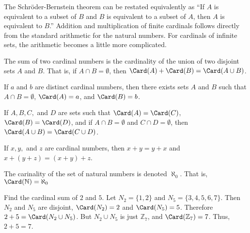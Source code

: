 \documentclass[crop=false,class=book,oneside]{standalone}
\begin{document}
            The Schr\"{o}der-Bernstein theorem can be restated
            equivalently as ``If $A$ is equivalent to a subset
            of $B$ and $B$ is equivalent to a subset of $A$,
            then $A$ is equivalent to $B$.''
            Addition and multiplication of finite cardinals
            follows directly from the standard arithmetic
            for the natural numbers. For cardinals of infinite
            sets, the arithmetic becomes a little more complicated.
            \begin{definition}
                The sum of two cardinal numbers is the
                cardinality of the union of two disjoint sets $A$
                and $B$. That is, if ${A}\cap{B}=\emptyset$, then
                $\Card(A)+\Card(B)=\Card({A}\cup{B})$.
            \end{definition}
            \begin{theorem*}
                If $a$ and $b$ are distinct cardinal numbers,
                then there exists sets $A$ and $B$ such that
                ${A}\cap{B}=\emptyset$, $\Card(A)=a$, and
                $\Card(B)=b$.
            \end{theorem*}
            \begin{theorem*}
                If $A,B,C,$ and $D$ are sets such that
                $\Card(A)=\Card(C)$, $\Card(B)=\Card(D)$,
                and if ${A}\cap{B}=\emptyset$ and
                ${C}\cap{D}=\emptyset$, then
                $\Card({A}\cup{B})=\Card({C}\cup{D})$.
            \end{theorem*}
            \begin{theorem*}
                If $x,y,$ and $z$ are cardinal numbers, then
                $x+y=y+x$ and $x+(y+z)=(x+y)+z$.
            \end{theorem*}
            \begin{notation}
                The carinality of the set of natural numbers
                is denoted $\aleph_{0}$. That is,
                $\Card(\mathbb{N})=\aleph_{0}$
            \end{notation}
            \begin{example}
                Find the cardinal sum of $2$ and $5$. Let
                $N_{2}=\{1,2\}$ and $N_{5}=\{3,4,5,6,7\}$.
                Then $N_{2}$ and $N_{5}$ are disjoint,
                $\Card(N_{2})=2$ and $\Card(N_{5})=5$.
                Therefore $2+5=\Card(N_{2}\cup{N_{5}})$.
                But ${N_{2}}\cup{N_{5}}$ is just $\mathbb{Z}_{7}$,
                and $\Card(\mathbb{Z}_{7})=7$. Thus, $2+5=7$.
            \end{example}
\end{document}

